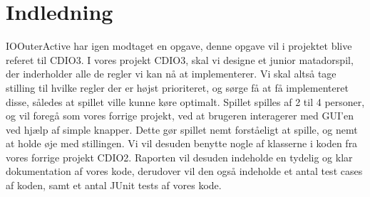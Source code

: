 \chapter{Indledning}
IOOuterActive har igen modtaget en opgave, denne opgave vil i projektet blive referet til CDIO3.
I vores projekt CDIO3, skal vi designe et junior matadorspil, der inderholder alle de regler vi kan nå at implementerer. Vi skal altså tage stilling til hvilke regler der er højst prioriteret, og sørge få at få implementeret disse, således at spillet ville kunne køre optimalt. Spillet spilles af 2 til 4 personer, og vil foregå som vores forrige projekt, ved at brugeren interagerer med GUI'en ved hjælp af simple knapper. Dette gør spillet nemt forståeligt at spille, og nemt at holde øje med stillingen. Vi vil desuden benytte nogle af klasserne i koden fra vores forrige projekt CDIO2. Raporten vil desuden indeholde en tydelig og klar dokumentation af vores kode, derudover vil den også indeholde et antal test cases af koden, samt et antal JUnit tests af vores kode.